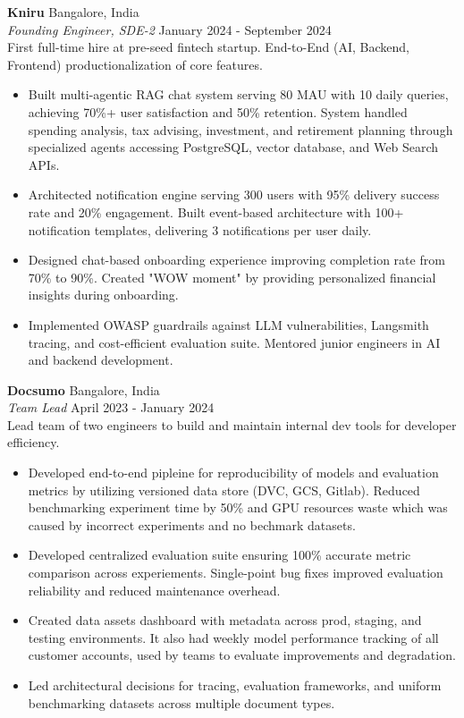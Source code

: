 \documentclass[a4paper]{article}
\begin{document}
\textbf{Kniru} \hfill Bangalore, India\\
\textit{Founding Engineer, SDE-2} \hfill January 2024 - September 2024\\
{First full-time hire at pre-seed fintech startup. End-to-End (AI, Backend, Frontend) productionalization of core features.}
\vspace{-1mm}
\begin{itemize} \itemsep 0pt
	\item Built multi-agentic RAG chat system serving 80 MAU with 10 daily queries, achieving 70\%+ user satisfaction and 50\% retention. System handled spending analysis, tax advising, investment, and retirement planning through specialized agents accessing PostgreSQL, vector database, and Web Search APIs.
	\item Architected notification engine serving 300 users with 95\% delivery success rate and 20\% engagement. Built event-based architecture with 100+ notification templates, delivering 3 notifications per user daily.
	\item Designed chat-based onboarding experience improving completion rate from 70\% to 90\%. Created "WOW moment" by providing personalized financial insights during onboarding.
	\item Implemented OWASP guardrails against LLM vulnerabilities, Langsmith tracing, and cost-efficient evaluation suite. Mentored junior engineers in AI and backend development.
\end{itemize}

\textbf{Docsumo} \hfill Bangalore, India\\
\textit{Team Lead} \hfill April 2023 - January 2024\\
{Lead team of two engineers to build and maintain internal dev tools for developer efficiency.}
\vspace{-1mm}
\begin{itemize} \itemsep 0pt
	\item Developed end-to-end pipleine for reproducibility of models and evaluation metrics by utilizing versioned data store (DVC, GCS, Gitlab). Reduced benchmarking experiment time by 50\% and GPU resources waste which was caused by incorrect experiments and no bechmark datasets. 
	\item Developed centralized evaluation suite ensuring 100\% accurate metric comparison across experiements. Single-point bug fixes improved evaluation reliability and reduced maintenance overhead.
	\item Created data assets dashboard with metadata across prod, staging, and testing environments. It also had weekly model performance tracking of all customer accounts, used by teams to evaluate improvements and degradation.
	\item Led architectural decisions for tracing, evaluation frameworks, and uniform benchmarking datasets across multiple document types.
\end{itemize}
\end{document}
